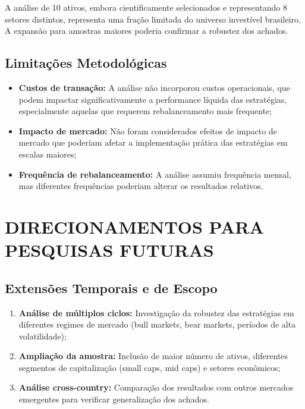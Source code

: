 \begin{itemize}
A análise de 10 ativos, embora cientificamente selecionados e representando 8 setores distintos, representa uma fração limitada do universo investível brasileiro. A expansão para amostras maiores poderia confirmar a robustez dos achados.

\subsection{Limitações Metodológicas}

\begin{itemize}
    \item \textbf{Custos de transação:} A análise não incorporou custos operacionais, que podem impactar significativamente a performance líquida das estratégias, especialmente aquelas que requerem rebalanceamento mais frequente;
    
    \item \textbf{Impacto de mercado:} Não foram considerados efeitos de impacto de mercado que poderiam afetar a implementação prática das estratégias em escalas maiores;
    
    \item \textbf{Frequência de rebalanceamento:} A análise assumiu frequência mensal, mas diferentes frequências poderiam alterar os resultados relativos.
\end{itemize}

\section{DIRECIONAMENTOS PARA PESQUISAS FUTURAS}

\subsection{Extensões Temporais e de Escopo}

\begin{enumerate}
    \item \textbf{Análise de múltiplos ciclos:} Investigação da robustez das estratégias em diferentes regimes de mercado (bull markets, bear markets, períodos de alta volatilidade);
    
    \item \textbf{Ampliação da amostra:} Inclusão de maior número de ativos, diferentes segmentos de capitalização (small caps, mid caps) e setores econômicos;
    
    \item \textbf{Análise cross-country:} Comparação dos resultados com outros mercados emergentes para verificar generalização dos achados.
\end{enumerate}


\end{itemize}
